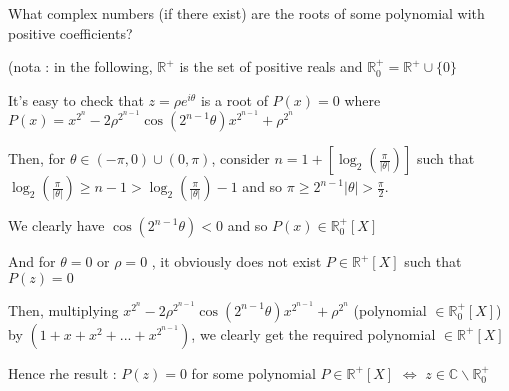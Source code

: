 \begin{solution}
	\begin{tcolorbox}What complex numbers (if there exist) are the roots of some polynomial with positive coefficients?\end{tcolorbox}

\begin{italicized}(nota : in the following, $ \mathbb R^+$ is the set of positive reals and $ \mathbb R_0^+=\mathbb R^+\cup\{0\}$\end{italicized}

It's easy to check that $ z=\rho e^{i\theta}$ is a root of $ P(x)=0$ where $ P(x)=x^{2^n}-2\rho^{2^{n-1}}\cos(2^{n-1}\theta)x^{2^{n-1}}+\rho^{2^n}$ 

Then, for $ \theta\in(-\pi,0)\cup(0,\pi)$, consider $ n=1+ \left[\log_2(\frac{\pi}{|\theta|})\right]$ such that $ \log_2(\frac{\pi}{|\theta|})\ge n-1 > \log_2(\frac{\pi}{|\theta|})-1$ and so $ \pi\ge 2^{n-1}|\theta| >\frac{\pi}2$. 

We clearly have $ \cos(2^{n-1}\theta)<0$ and so $ P(x)\in\mathbb R_0^+[X]$

And for $ \theta=0$ or $ \rho=0$ , it obviously does not exist $ P\in\mathbb R^+[X]$ such that $ P(z)=0$

Then, multiplying $ x^{2^n}-2\rho^{2^{n-1}}\cos(2^{n-1}\theta)x^{2^{n-1}}+\rho^{2^n}$ (polynomial $ \in\mathbb R_0^+[X]$) by $ (1+x+x^2+...+x^{2^{n-1}})$, we clearly get the required polynomial $ \in\mathbb R^+[X]$

Hence rhe result : $ P(z)=0$ for some polynomial $ P\in\mathbb R^+[X]$ $ \iff$ $ z\in\mathbb C\backslash\mathbb R_0^+$
\end{solution}



